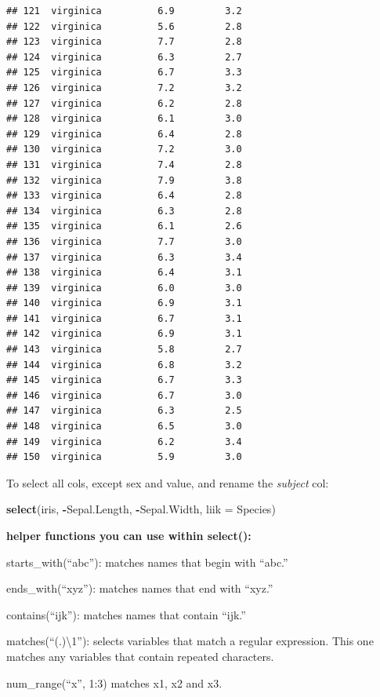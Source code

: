 \documentclass[]{book}
\newenvironment{Shaded}{\begin{snugshade}}{\end{snugshade}}
\newcommand{\KeywordTok}[1]{\textcolor[rgb]{0.13,0.29,0.53}{\textbf{#1}}}
\newcommand{\DataTypeTok}[1]{\textcolor[rgb]{0.13,0.29,0.53}{#1}}
\newcommand{\OperatorTok}[1]{\textcolor[rgb]{0.81,0.36,0.00}{\textbf{#1}}}
\newcommand{\NormalTok}[1]{#1}
\begin{document}
\begin{verbatim}
## 121  virginica          6.9         3.2
## 122  virginica          5.6         2.8
## 123  virginica          7.7         2.8
## 124  virginica          6.3         2.7
## 125  virginica          6.7         3.3
## 126  virginica          7.2         3.2
## 127  virginica          6.2         2.8
## 128  virginica          6.1         3.0
## 129  virginica          6.4         2.8
## 130  virginica          7.2         3.0
## 131  virginica          7.4         2.8
## 132  virginica          7.9         3.8
## 133  virginica          6.4         2.8
## 134  virginica          6.3         2.8
## 135  virginica          6.1         2.6
## 136  virginica          7.7         3.0
## 137  virginica          6.3         3.4
## 138  virginica          6.4         3.1
## 139  virginica          6.0         3.0
## 140  virginica          6.9         3.1
## 141  virginica          6.7         3.1
## 142  virginica          6.9         3.1
## 143  virginica          5.8         2.7
## 144  virginica          6.8         3.2
## 145  virginica          6.7         3.3
## 146  virginica          6.7         3.0
## 147  virginica          6.3         2.5
## 148  virginica          6.5         3.0
## 149  virginica          6.2         3.4
## 150  virginica          5.9         3.0
\end{verbatim}

To select all cols, except sex and value, and rename the \emph{subject}
col:

\begin{Shaded}
\begin{Highlighting}[]
\KeywordTok{select}\NormalTok{(iris, }\OperatorTok{-}\NormalTok{Sepal.Length, }\OperatorTok{-}\NormalTok{Sepal.Width, }\DataTypeTok{liik =}\NormalTok{ Species)}
\end{Highlighting}
\end{Shaded}

\textbf{helper functions you can use within select():}

starts\_with(``abc''): matches names that begin with ``abc.''

ends\_with(``xyz''): matches names that end with ``xyz.''

contains(``ijk''): matches names that contain ``ijk.''

matches(``(.)\textbackslash{}1''): selects variables that match a
regular expression. This one matches any variables that contain repeated
characters.

num\_range(``x'', 1:3) matches x1, x2 and x3.
\end{document}
